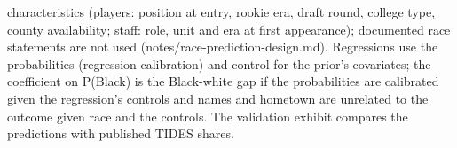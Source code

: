 \begin{table}[!h]
{\begin{threeparttable}
\begin{tablenotes}[para]
characteristics (players: position at entry, rookie era, draft round, college type, county availability; staff: role, unit and era at first appearance); documented race statements are not used (notes/race-prediction-design.md). Regressions use the probabilities (regression calibration) and control for the prior's covariates; the coefficient on P(Black) is the Black-white gap if the probabilities are calibrated given the regression's controls and names and hometown are unrelated to the outcome given race and the controls. The validation exhibit compares the predictions with published TIDES shares.
\end{tablenotes}
\end{threeparttable}}
\end{table}
